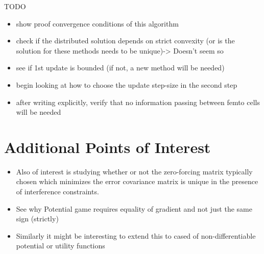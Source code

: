 \documentclass[12pt]{article}
\begin{document}
TODO 
\begin{itemize}
\item show proof convergence conditions of this algorithm
\item check if the distributed solution depends on strict convexity (or is  the solution for these methods needs to be unique)-> Doesn't seem so
\item see if 1st update is bounded (if not, a new method will be needed)
\item begin looking at how to choose the update step-size in the second step
\item after writing explicitly, verify that no information passing between femto cells will be needed 
\end{itemize}

\section{Additional Points of Interest}
\begin{itemize}
\item 
Also of interest is studying whether or not the zero-forcing matrix typically chosen which minimizes the error covariance matrix is unique in the presence of interference constraints. 
\item 
See why Potential game requires equality of gradient and not just the same sign (strictly)
\item Similarly it might be interesting to extend this to cased of non-differentiable potential or utility functions
\end{itemize}


\newpage

\end{document}
